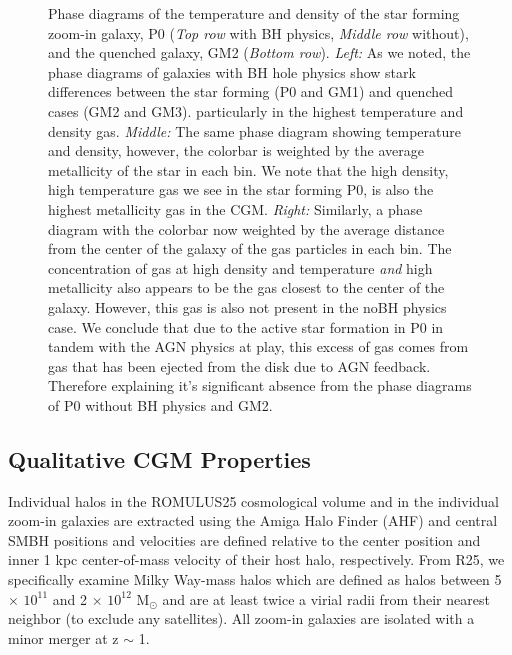 \documentclass[]{emulateapj}
\begin{document}
\begin{figure}[h!]
\caption[]{Phase diagrams of the temperature and density of the star forming zoom-in galaxy, P0 (\textit{Top row} with BH physics, \textit{Middle row} without), and the quenched galaxy, GM2 (\textit{Bottom row}). \textit{Left:} As we noted, the phase diagrams of galaxies with BH hole physics show stark differences between the star forming (P0 and GM1) and quenched cases (GM2 and GM3).  particularly in the highest temperature and density gas. \textit{Middle:} The same phase diagram showing temperature and density, however, the colorbar is weighted by the average metallicity of the star in each bin. We note that the high density, high temperature gas we see in the star forming P0, is also the highest metallicity gas in the CGM. \textit{Right:} Similarly, a phase diagram with the colorbar now weighted by the average distance from the center of the galaxy of the gas particles in each bin. The concentration of gas at high density and temperature \textit{and} high metallicity also appears to be the gas closest to the center of the galaxy. However, this gas is also not present in the noBH physics case. We conclude that due to the active star formation in P0 in tandem with the AGN physics at play, this excess of gas comes from gas that has been ejected from the disk due to AGN feedback. Therefore explaining it's significant absence from the phase diagrams of P0 without BH physics and GM2.}
\label{figure:phasediagrams_z_R}
\end{figure}


\subsection{Qualitative CGM Properties}

Individual halos in the ROMULUS25 cosmological volume and in the individual zoom-in galaxies are extracted using the Amiga Halo Finder (AHF) \citep{Knollmann2009} and central SMBH positions and velocities are defined relative to the center position and inner 1 kpc center-of-mass velocity of their host halo, respectively. From R25, we specifically examine Milky Way-mass halos which are defined as halos between 5 $\times$ $10^{11}$ and 2 $\times$ $10^{12}$ M$_{\odot}$ and are at least twice a virial radii from their nearest neighbor (to exclude any satellites). All zoom-in galaxies are isolated with a minor merger at z $\sim$ 1.  
\end{document}
